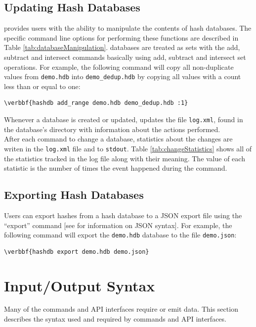 \documentclass[11pt,fleqn]{article} %
\begin{document}
\subsection{Updating Hash Databases}
\label{updateSection}
\hdb provides users with the ability to manipulate the contents of hash databases. The specific command line options for performing these functions are described in Table \ref{tab:databaseManipulation}. \hdb databases are treated as sets with the add, subtract and intersect commands basically using add, subtract and intersect set operations. For example, the following command will copy all non-duplicate values from \texttt{demo.hdb} into \texttt{demo\_dedup.hdb} by copying all values with a count less than or equal to one:
\begin{Verbatim}[commandchars=\\\{\}]
\verbbf{hashdb add_range demo.hdb demo_dedup.hdb :1}
\end{Verbatim}
Whenever a database is created or updated, \hdb updates the file \texttt{log.xml}, found in the database's directory with information about the actions performed.\\

After each command to change a database, statistics about the changes are writen in the \texttt{log.xml} file and to \texttt{stdout}. Table \ref{tab:changeStatistics} shows all of the statistics tracked in the log file along with their meaning. The value of each statistic is the number of times the event happened during the command.\\


\subsection{Exporting Hash Databases}
Users can export hashes from a hash database to a JSON export file using the ``export'' command [see \textbf{} for information on JSON syntax].  For example, the following command will export the \texttt{demo.hdb} database to the file \texttt{demo.json}:
\begin{Verbatim}[commandchars=\\\{\}]
\verbbf{hashdb export demo.hdb demo.json}
\end{Verbatim}

\section{\hdb Input/Output Syntax}
\label{InputOutputSyntax}
Many of the \hdb commands and API interfaces require or emit data.
This section describes the syntax used and required by \hdb
commands and API interfaces.
\end{document}

